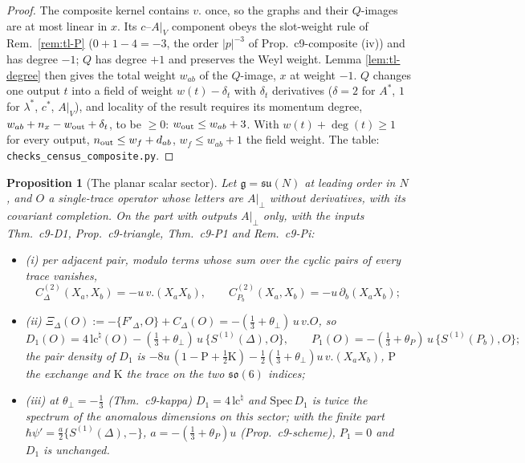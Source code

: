\documentclass[11pt]{article}
\numberwithin{equation}{section}
\theoremstyle{plain}
\newtheorem{proposition}[theorem]{Proposition}
\theoremstyle{definition}
\begin{document}
\begin{proof}
The composite kernel contains $v.$ once, so the graphs and their $Q$-images are at most linear in $x$. Its $c$--$A|_V$ component obeys the slot-weight rule of Rem.~\ref{rem:tl-P} ($0+1-4=-3$, the order $|p|^{-3}$ of Prop.~c9-composite (iv)) and has degree $-1$; $Q$ has degree $+1$ and preserves the Weyl weight. Lemma \ref{lem:tl-degree} then gives the total weight $w_{ab}$ of the $Q$-image, $x$ at weight $-1$. $Q$ changes one output $t$ into a field of weight $w(t)-\delta_t$ with $\delta_t$ derivatives ($\delta=2$ for $A^*$, $1$ for $\lambda^*$, $c^*$, $A|_V$), and locality of the result requires its momentum degree, $w_{ab}+n_x-w_{\rm out}+\delta_t$, to be $\ge0$: $w_{\rm out}\le w_{ab}+3$. With $w(t)+\deg(t)\ge1$ for every output, $n_{\rm out}\le w_f+d_{ab}$, $w_f\le w_{ab}+1$ the field weight. The table: \texttt{checks\_census\_composite.py}.
\end{proof}

\begin{proposition}[The planar scalar sector]
\label{prop:tl-scalarsector}
Let $\mathfrak g=\mathfrak{su}(N)$ at leading order in $N$, and $O$ a single-trace operator whose letters are $A|_\perp$ without derivatives, with its covariant completion. On the part with outputs $A|_\perp$ only, with the inputs Thm.~c9-D1, Prop.~c9-triangle, Thm.~c9-P1 and Rem.~c9-Pi:
\begin{itemize}
\item (i) per adjacent pair, modulo terms whose sum over the cyclic pairs of every trace vanishes,
\[
C^{(2)}_\Delta(X_a,X_b)=-u\,v.(X_aX_b),\qquad C^{(2)}_{P_b}(X_a,X_b)=-u\,\partial_b(X_aX_b);
\]
\item (ii) $\Xi_\Delta(O):=-\{F'_\Delta,O\}+C_\Delta(O)=-(\tfrac13+\theta_\perp)\,u\,v.O$, so
\[
D_1(O)=4\,\mathrm{lc}^\natural(O)-(\tfrac13+\theta_\perp)\,u\,\{S^{(1)}(\Delta),O\},\qquad P_1(O)=-(\tfrac13+\theta_P)\,u\,\{S^{(1)}(P_b),O\};
\]
the pair density of $D_1$ is $-8u\,(1-\mathrm P+\tfrac12\mathrm K)-\tfrac12(\tfrac13+\theta_\perp)u\,v.(X_aX_b)$, $\mathrm P$ the exchange and $\mathrm K$ the trace on the two $\mathfrak{so}(6)$ indices;
\item (iii) at $\theta_\perp=-\tfrac13$ (Thm.~c9-kappa) $D_1=4\,\mathrm{lc}^\natural$ and $\mathrm{Spec}\,D_1$ is twice the spectrum of the anomalous dimensions on this sector; with the finite part $\hbar\psi'=\tfrac a2\{S^{(1)}(\Delta),-\}$, $a=-(\tfrac13+\theta_P)u$ (Prop.~c9-scheme), $P_1=0$ and $D_1$ is unchanged.
\end{itemize}
\end{proposition}
\end{document}
